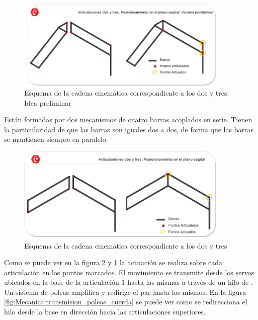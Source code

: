     \begin{figure}[H]
       	\centering
       	\includegraphics[width=0.9\textwidth]{figuras/Imagenes_Mecanica/mecanismos_4_barras_triangulo.png}   
       	\caption{Esquema de la cadena cinemática correspondiente a los  dos y tres. Idea preliminar}
       	\label{fig:Mecanica:4_bar_mecanism_triangle}
    \end{figure}
    
    Están formadas por dos mecanismos de cuatro barras acoplados en serie. Tienen la particularidad de que las barras son iguales dos a dos, de forma que las barras se mantienen siempre en paralelo. 
    \\ 
    
    \begin{figure}[H]
    	\centering
    	\includegraphics[width=0.9\textwidth]{figuras/Imagenes_Mecanica/mecanismos_4_barras.png}   
    	\caption{Esquema de la cadena cinemática correspondiente a los  dos y tres}
    	\label{fig:Mecanica:4_bar_mecanism}
    \end{figure}
    
    Como se puede ver en la figura \ref{fig:Mecanica:4_bar_mecanism} y \ref{fig:Mecanica:4_bar_mecanism_triangle} la actuación se realiza sobre cada articulación en los puntos marcados. El movimiento se transmite desde los servos ubicados en la base de la articulación 1 hasta las mismas a través de un hilo de . Un sistema de poleas amplifica y redirige el par hasta los mismos. En la figura \ref{fig:Mecanica:transmision_poleas_cuerda} se puede ver como se redirecciona el hilo desde la base en dirección hacia las articulaciones superiores.
    
